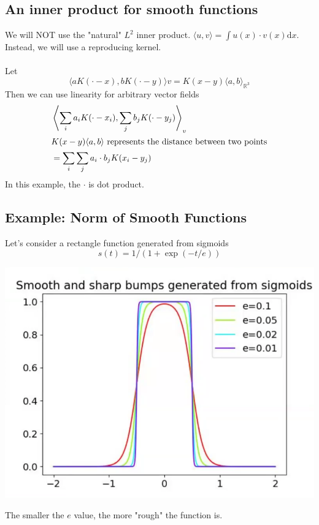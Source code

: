 \documentclass[10pt]{article}
\begin{document}
\subsection*{An inner product for smooth functions}
We will NOT use the "natural" $L^2$ inner product.  $\langle u, v \rangle = \int u(x) \cdot v(x) \text{d}x$.  Instead, we will use a reproducing kernel.\\\\
Let
\[\langle a K( \cdot - x), bK(\cdot - y) \rangle v = K(x - y) \langle a, b \rangle_{\mathbb{R}^3}\]
Then we can use linearity for arbitrary vector fields
\begin{align*}
    &\left\langle \sum_i a_i K(\cdot - x_i), \sum_j b_j K(\cdot - y_j) \right\rangle_v\\
    \intertext{$K(x - y)\langle a, b \rangle$ represents the distance between two points}
    &= \sum_i \sum_j a_i \cdot b_j K(x_i - y_j)
\end{align*}
In this example, the $\cdot$ is dot product.

\subsection*{Example: Norm of Smooth Functions}
Let's consider a rectangle function generated from sigmoids
\[s(t) = 1 / (1 + \exp(-t / e))\]
\begin{center}
    \includegraphics*[scale=0.5]{W3_7.png}
\end{center}
The smaller the $e$ value, the more "rough" the function is.
\end{document}
